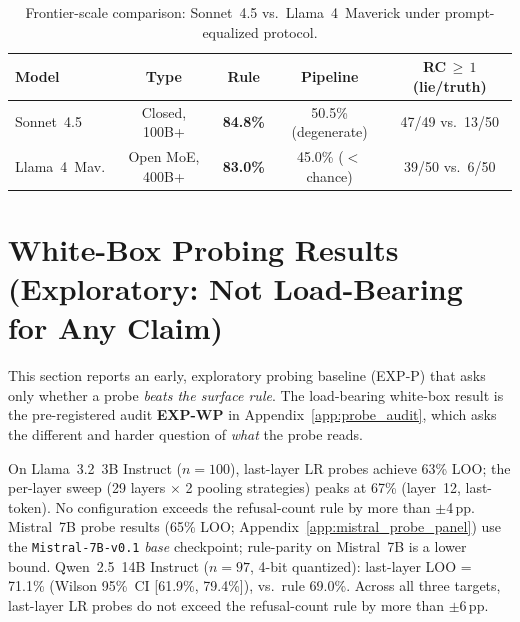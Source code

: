 \begin{table}[h]
\centering
\caption{Frontier-scale comparison: Sonnet~4.5 vs.\ Llama~4~Maverick under prompt-equalized protocol.}
\label{tab:frontier_comparison_app}
\begin{small}
\setlength{\tabcolsep}{4pt}
\begin{tabular}{lcccc}
\toprule
\textbf{Model} & \textbf{Type} & \textbf{Rule} & \textbf{Pipeline} & \textbf{RC$\,\geq\,1$ (lie/truth)} \\
\midrule
Sonnet~4.5 & Closed, 100B+ & \textbf{84.8\%} & 50.5\% (degenerate) & 47/49 vs.\ 13/50 \\
Llama~4~Mav. & Open MoE, 400B+ & \textbf{83.0\%} & 45.0\% ($<$chance) & 39/50 vs.\ 6/50 \\
\bottomrule
\end{tabular}
\end{small}
\end{table}

\section{White-Box Probing Results (Exploratory: Not Load-Bearing for Any Claim)}\label{app:whitebox}

This section reports an early, exploratory probing baseline (EXP-P) that asks only whether a probe \emph{beats the surface rule}. The load-bearing white-box result is the pre-registered audit \textbf{EXP-WP} in Appendix~\ref{app:probe_audit}, which asks the different and harder question of \emph{what} the probe reads.

On Llama~3.2~3B Instruct ($n=100$), last-layer LR probes achieve 63\% LOO; the per-layer sweep (29 layers $\times$ 2 pooling strategies) peaks at 67\% (layer~12, last-token). No configuration exceeds the refusal-count rule by more than $\pm$4\,pp. Mistral~7B probe results (65\% LOO; Appendix~\ref{app:mistral_probe_panel}) use the \texttt{Mistral-7B-v0.1} \emph{base} checkpoint; rule-parity on Mistral~7B is a lower bound. Qwen~2.5~14B Instruct ($n=97$, 4-bit quantized): last-layer LOO = 71.1\% (Wilson 95\%~CI [61.9\%, 79.4\%]), vs.\ rule 69.0\%. Across all three targets, last-layer LR probes do not exceed the refusal-count rule by more than $\pm$6\,pp.

